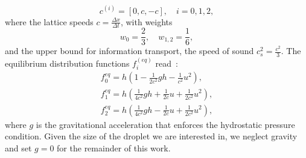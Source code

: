 \documentclass[twocolumn,amsmath,amssymb,showpacs,pre,nofootinbib,superscriptaddress]{revtex4-1} %
\begin{document}
\begin{equation}\label{eq:speeds}
c^{(i)}  = [0, c, -c], \quad i = 0, 1, 2,
\end{equation}
where the lattice speeds $c=\frac{\Delta x}{\Delta t}$, with weights
\begin{equation}
w_0 = \frac{2}{3},\quad w_{1,2} = \frac{1}{6},
\end{equation}
and the upper bound for information transport, the speed of sound $c_s^2=\frac{c^2}{3}$.
The equilibrium distribution functions $f_i^{(eq)}$ read~\cite{VANTHANG20107373}:
\begin{gather}
    f_{0}^{eq} = h\left(1-\frac{1}{2c^2}gh - \frac{1}{c^2}u^2\right),\nonumber\\
    f_{1}^{eq} = h\left(\frac{1}{4c^2}gh + \frac{1}{2c}u + \frac{1}{2c^2}u^2\right)\label{eq:equilibria},\\
    f_{2}^{eq} = h\left(\frac{1}{4c^2}gh - \frac{1}{2c}u + \frac{1}{2c^2}u^2\right),\nonumber
\end{gather}
where $g$ is the gravitational acceleration that enforces the hydrostatic pressure condition. 
Given the size of the droplet we are interested in, we neglect gravity and set $g=0$ for the remainder of this work.
\end{document}
